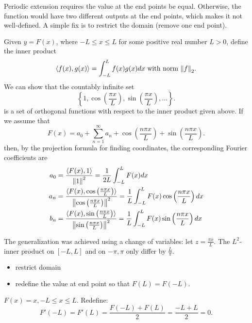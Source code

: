 \documentclass[class=article,crop=false]{standalone}
\begin{document}
\begin{note}[]
	Periodic extension requires the value at the end points be equal. Otherwise, the function would have two different outputs at the end points, which makes it not well-defined. A simple fix is to restrict the domain (remove one end point). 
\end{note}

\begin{defn}
	Given $y=F(x)$, where  $-L\leq x \leq L$ for some positive real number  $L>0$, define the inner product
	 \[
		 \langle f(x),g(x) \rangle = \int_{ -L}^{ L}  f(x) g(x) dx  \text{ with norm } {\left\lVert{f}\right\rVert}_2  
	.\] 
	We can show that the countably infinite set
	\[
		\left\{ 1,\cos\left( \frac{\pi x}{L} \right), \sin \left( \frac{\pi x}{L} \right), \ldots   \right\} 
	.\] 
	is a set of orthogonal functions with respect to the inner product given above. If we assume that 
	\[
		F(x) = a_0 + \sum_{ n=1}^{\infty} a_n + \cos\left( \frac{n\pi x}{L} \right) + \sin\left( \frac{n \pi x}{L} \right) 
	.\] 
	then, by the projection formula for finding coordinates, the corresponding Fourier coefficients are
	\begin{align*}
		a_0 &= \frac{\langle F(x),1 \rangle}{{\left\lVert{1}\right\rVert}^2 } =\frac{1}{2L} \int_{ -L}^{ L} F(x) dx\\
		a_n &= \frac{\langle F(x), \cos\left( \frac{n\pi x}{L} \right)  \rangle}{{\left\lVert{ \cos\left( \frac{n \pi x}{L} \right)}\right\rVert}^2 } = \frac{1}{L} \int_{ -L}^{ L} F(x) \cos\left( \frac{n \pi x}{L} \right) dx\\
		b_n &=  \frac{\langle F(x), \sin\left( \frac{n\pi x}{L} \right)  \rangle}{{\left\lVert{ \sin\left( \frac{n \pi x}{L} \right)}\right\rVert}^2 } = \frac{1}{L} \int_{ -L}^{ L} F(x) \sin\left( \frac{n \pi x}{L} \right) dx
	\end{align*}
\end{defn}

\begin{note}[]
	The generalization was achieved using a change of variables: let $z = \frac{\pi x}{L}$. The $L^2$-inner product on $[-L,L]$ and on $-\pi,\pi$ only differ by  $\frac{L}{\pi}$.
\end{note}


\begin{itemize}
	\item restrict domain
	\item redefine the value at end point so that $F(L)=F(-L)$.
\end{itemize}

\begin{eg}[]
	$F(x) = x, -L\leq x\leq L$. Redefine:
	 \[
		 F'(-L)=F'(L) = \frac{F(-L)+F(L)}{2} = \frac{-L+L}{2} = 0
	.\] 
\end{eg}
\end{document}
